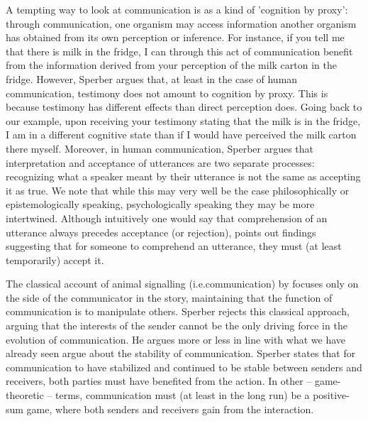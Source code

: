A tempting way to look at communication is as a kind of 'cognition by proxy': through communication, one organism may access information another organism has obtained from its own perception or inference. For instance, if you tell me that there is milk in the fridge, I can through this act of communication benefit from the information derived from your perception of the milk carton in the fridge.
However, Sperber argues that, at least in the case of human communication, testimony does not amount to cognition by proxy. This is because testimony has different effects than direct perception does. Going back to our example, upon receiving your testimony stating that the milk is in the fridge, I am in a different cognitive state than if I would have perceived the milk carton there myself. Moreover, in human communication, Sperber argues that interpretation and acceptance of utterances are two separate processes: recognizing what a speaker meant by their utterance is not the same as accepting it as true.
We note that while this may very well be the case philosophically or epistemologically speaking, psychologically speaking they may be more intertwined. Although intuitively one would say that comprehension of an utterance always precedes acceptance (or rejection), \citet{Lewandowsky12} points out findings suggesting that for someone to comprehend an utterance, they must (at least temporarily) accept it.

The classical account of animal signalling (i.e.\@ communication) by \citet{DawkinsKrebs78} focuses only on the side of the communicator in the story, maintaining that the function of communication is to manipulate others. Sperber rejects this classical approach, arguing that the interests of the sender cannot be the only driving force in the evolution of communication.
He argues more or less in line with what we have already seen \citet{Scott-Phillips08} argue about the stability of communication.
Sperber states that for communication to have stabilized and continued to be stable between senders and receivers, both parties must have benefited from the action. In other -- game-theoretic -- terms, communication must (at least in the long run) be a positive-sum game, where both senders and receivers gain from the interaction.

